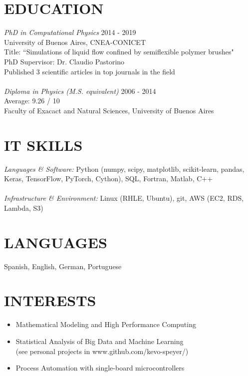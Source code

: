 \documentclass[margin]{res}
\begin{document}
\begin{resume}
\section{EDUCATION} {\sl PhD in Computational Physics}  \hfill 2014 - 2019 \\
                University of Buenos Aires, CNEA-CONICET \\ 
                Title: ``Simulations of liquid flow confined by semiflexible 
		polymer brushes"  \\
                PhD Supervisor: Dr. Claudio Pastorino \\ 
                Published 3 scientific articles in top journals in the field \\ 
		\\
 		{\sl Diploma in Physics (M.S. equivalent) }  \hfill 2006 - 2014 \\ 
		Average: 9.26 / 10 \\
		Faculty of Exacact and Natural Sciences, University of Buenos Aires

 
    \section{IT SKILLS} {\sl Languages \& Software:} Python (numpy, scipy, matplotlib, scikit-learn, pandas, Keras, TensorFlow, PyTorch, Cython), SQL, Fortran, Matlab, C++ \\ \\ 
    {\sl Infrastructure \& Environment:} Linux (RHLE, Ubuntu), git, AWS (EC2, RDS, Lambda, S3) \\
               
 
\section{LANGUAGES}  Spanish, English, German, Portuguese 

\section{INTERESTS}        
       \begin{itemize}  \itemsep -2pt %
        \item	Mathematical Modeling and High Performance Computing 
	\item   Statistical Analysis of Big Data and Machine Learning \\ 
	    	(see personal projects in www.github.com/kevo-speyer/) 
    	\item	Process Automation with single-board microcontrollers 
       \end{itemize}
 

\end{resume}
\end{document}
